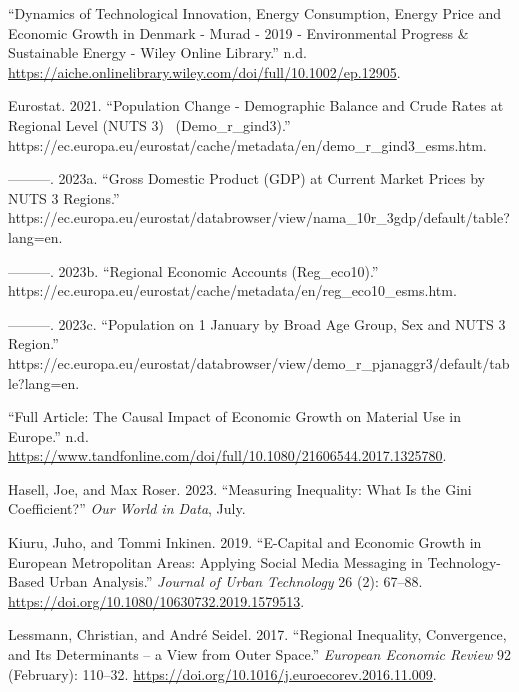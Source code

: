 \documentclass[
  a4paper,
  DIV=11,
  numbers=noendperiod]{scrartcl}
\newlength{\cslhangindent}
\newlength{\cslentryspacingunit} %
\newenvironment{CSLReferences}[2] %
 {%
  \setlength{\parindent}{0pt}
  \ifodd #1
  \let\oldpar\par
  \def\par{\hangindent=\cslhangindent\oldpar}
  \fi
  \setlength{\parskip}{#2\cslentryspacingunit}
 }%
 {}
\begin{document}
\hypertarget{refs}{}
\begin{CSLReferences}{1}{0}
\leavevmode{}%
{``Dynamics of Technological Innovation, Energy Consumption, Energy
Price and Economic Growth in Denmark - Murad - 2019 - Environmental
Progress \& Sustainable Energy - Wiley Online Library.''} n.d.
\url{https://aiche.onlinelibrary.wiley.com/doi/full/10.1002/ep.12905}.

\leavevmode{}%
Eurostat. 2021. {``Population Change - {Demographic} Balance and Crude
Rates at Regional Level ({NUTS} 3)~ (Demo\_r\_gind3).''}
https://ec.europa.eu/eurostat/cache/metadata/en/demo\_r\_gind3\_esms.htm.

\leavevmode{}%
---------. 2023a. {``Gross Domestic Product ({GDP}) at Current Market
Prices by {NUTS} 3 Regions.''}
https://ec.europa.eu/eurostat/databrowser/view/nama\_10r\_3gdp/default/table?lang=en.

\leavevmode{}%
---------. 2023b. {``Regional Economic Accounts (Reg\_eco10).''}
https://ec.europa.eu/eurostat/cache/metadata/en/reg\_eco10\_esms.htm.

\leavevmode{}%
---------. 2023c. {``Population on 1 {January} by Broad Age Group, Sex
and {NUTS} 3 Region.''}
https://ec.europa.eu/eurostat/databrowser/view/demo\_r\_pjanaggr3/default/table?lang=en.

\leavevmode{}%
{``Full Article: The Causal Impact of Economic Growth on Material Use in
Europe.''} n.d.
\url{https://www.tandfonline.com/doi/full/10.1080/21606544.2017.1325780}.

\leavevmode{}%
Hasell, Joe, and Max Roser. 2023. {``Measuring Inequality: {What} Is the
{Gini} Coefficient?''} \emph{Our World in Data}, July.

\leavevmode{}%
Kiuru, Juho, and Tommi Inkinen. 2019. {``E-Capital and Economic Growth
in European Metropolitan Areas: Applying Social Media Messaging in
Technology-Based Urban Analysis.''} \emph{Journal of Urban Technology}
26 (2): 67--88. \url{https://doi.org/10.1080/10630732.2019.1579513}.

\leavevmode{}%
Lessmann, Christian, and André Seidel. 2017. {``Regional Inequality,
Convergence, and Its Determinants -- a View from Outer Space.''}
\emph{European Economic Review} 92 (February): 110--32.
\url{https://doi.org/10.1016/j.euroecorev.2016.11.009}.


\end{CSLReferences}
\end{document}
